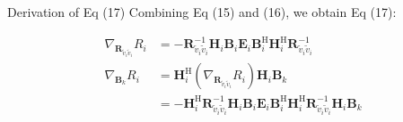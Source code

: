\documentclass[aspectratio=169, 10pt]{beamer}
\begin{document}
\begin{frame}{Derivation of Eq (17)}
    Combining Eq (15) and (16), we obtain Eq (17):
    \vspace{2ex}

    \begin{align}
        \nabla_{\mathbf{R}_{\tilde{v}_i\tilde{v}_i}} R_i & = - \mathbf{R}_{\tilde{v}_i\tilde{v}_i}^{-1} \mathbf{H}_i \mathbf{B}_i \mathbf{E}_i \mathbf{B}_i^\mathrm{H} \mathbf{H}_i^\mathrm{H} \mathbf{R}_{\tilde{v}_i\tilde{v}_i}^{-1} \tag{16} \\
        \nabla_{\mathbf{B}_{k}}R_{i}                     & =\mathbf{H}_i^{\mathrm{H}}\left(
        \nabla_{\mathbf{R}_{\tilde{v}_i\tilde{v}_i}}R_{i}\right)\mathbf{H}_{i}\mathbf{B}_{k} \tag{15}                                                                                                                                            \\
                                                         & =-\mathbf{H}_i^\mathrm{H} \mathbf{R}_{\tilde{v}_i\tilde{v}_i}^{-1} \mathbf{H}_i \mathbf{B}_i \mathbf{E}_i
        \mathbf{B}_i^\mathrm{H}
        \mathbf{H}_i^\mathrm{H} \mathbf{R}_{\tilde{v}_i\tilde{v}_i}^{-1} \mathbf{H}_i \mathbf{B}_k \tag{17}
    \end{align}

    \vspace{2ex}

    \begin{flushright}
        \hyperlink{main-wsr_Ri2}{}
    \end{flushright}
\end{frame}
\end{document}
